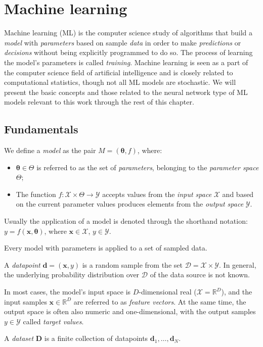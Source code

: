 \section{Machine learning}
Machine learning (ML) is the computer science study of algorithms that build a \emph{model} with \emph{parameters} based on sample \emph{data} in order to make \emph{predictions} or \emph{decisions} without being explicitly programmed to do so. The process of learning the model's parameters is called \emph{training}. Machine learning is seen as a part of the computer science field of artificial intelligence and is closely related to computational statistics, though not all ML models are stochastic. We will present the basic concepts and those related to the neural network type of ML models relevant to this work through the rest of this chapter. 

\subsection{Fundamentals}

\begin{definition}
We define a \emph{model} as the pair $M = (\pmb{\theta}, f)$, where:
\begin{itemize}
\item $\pmb{\theta} \in \Theta$ is referred to as the set of \emph{parameters}, belonging to the \emph{parameter space} $\Theta$;
\item The function $f: \mathcal{X} \times \Theta \to \mathcal{Y}$ accepts values from the \emph{input space} $\mathcal{X}$ and based on the current parameter values produces elements from the \emph{output space} $\mathcal{Y}$.
\end{itemize}
Usually the application of a model is denoted through the shorthand notation:\\ $y = f(\pmb{x}, \pmb{\theta})$, where $\pmb{x} \in \mathcal{X}$, $y \in \mathcal{Y}$.
\end{definition}

Every model with parameters is applied to a set of sampled data.

\begin{definition}
A \emph{datapoint} $\pmb{d}=(\pmb{x}, y)$ is a random sample from the set $\mathcal{D} = \mathcal{X} \times \mathcal{Y}$. In general, the underlying probability distribution over $\mathcal{D}$ of the data source is not known. 

In most cases, the model's input space is $D$-dimensional real ($\mathcal{X}=\mathbb{R}^D$), and the input samples $\pmb{x} \in \mathbb{R}^D$ are referred to as \emph{feature vectors}. At the same time, the output space is often also numeric and one-dimensional, with the output samples $y \in \mathcal{Y}$ called \emph{target values}.  

A \emph{dataset} $\pmb{D}$ is a finite collection of datapoints $\pmb{d}_1,\dots,\pmb{d}_N$.
\end{definition}

